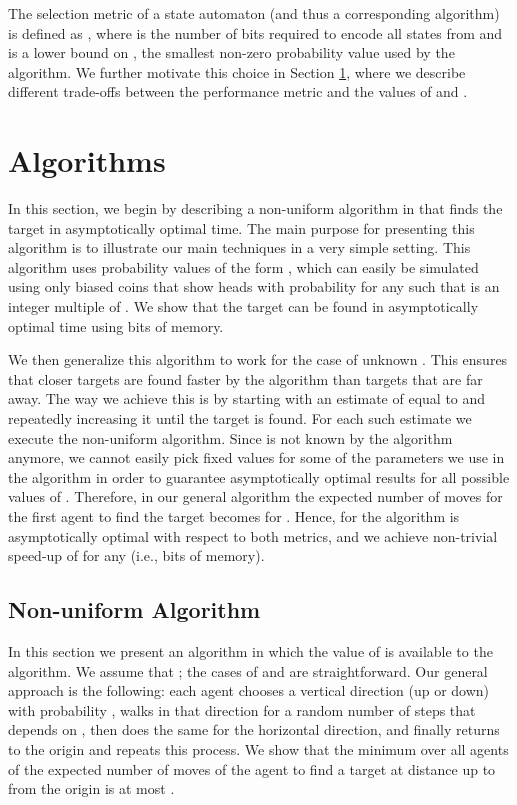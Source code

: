 \documentclass[11pt]{article}
\begin{document}
The selection metric of a state automaton (and thus a corresponding algorithm) is defined as , where  is the number of bits required to encode all states from  and  is a lower bound on , the smallest non-zero probability value used by the algorithm. We further motivate this choice in Section \ref{sec:upper}, where we describe different trade-offs between the performance metric and the values of  and .

\section{Algorithms}
\label{sec:upper}
In this section, we begin by describing a non-uniform algorithm in  that finds the target in asymptotically optimal time. The main purpose for presenting this algorithm is to illustrate our main techniques in a very simple setting. This algorithm uses probability values of the form , which can easily be simulated using only biased coins that show heads with probability  for any  such that  is an integer multiple of . We show that the target can be found in asymptotically optimal time using  bits of memory. 

We then generalize this algorithm to work for the case of unknown . This ensures that closer targets are found faster by the algorithm than targets that are far away. The way we achieve this is by starting with an estimate of  equal to  and repeatedly increasing it until the target is found. For each such estimate we execute the non-uniform algorithm. Since  is not known by the algorithm anymore, we cannot easily pick fixed values for some of the parameters we use in the algorithm in order to guarantee asymptotically optimal results for all possible values of . Therefore, in our general algorithm the expected number of moves for the first agent to find the target becomes  for . Hence, for  the algorithm is asymptotically optimal with respect to both metrics, and we achieve non-trivial speed-up of  for any  (i.e.,  bits of memory).

\subsection{Non-uniform Algorithm}
\label{sec:non-uniform}

In this section we present an algorithm in which the value of  is available to the algorithm. We assume that ; the cases of  and  are straightforward. Our general approach is the following: each agent chooses a vertical direction (up or down) with probability , walks in that direction for a random number of steps that depends on , then does the same for the horizontal direction, and finally returns to the origin and repeats this process. We show that the minimum over all agents of the expected number of moves of the agent to find a target at distance up to  from the origin is at most . 
\end{document}
